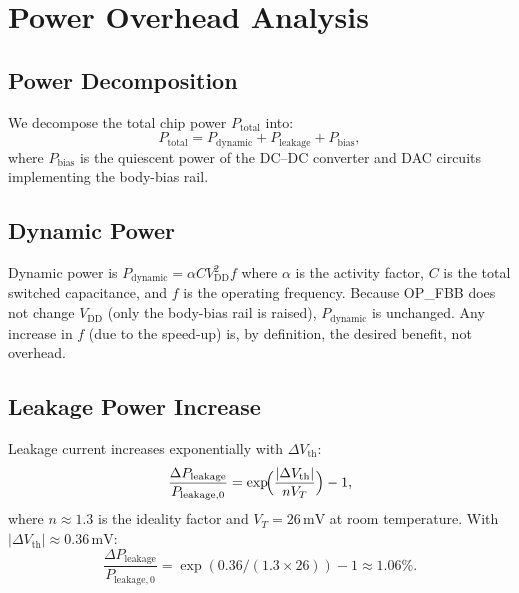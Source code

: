 \medskip
\noindent\anchorline{}

\section{Power Overhead Analysis}
\label{sec:power-overhead}

\subsection{Power Decomposition}
\label{subsec:power-decomp}

We decompose the total chip power $P_{\mathrm{total}}$ into:
\begin{equation}
  P_{\mathrm{total}} = P_{\mathrm{dynamic}} + P_{\mathrm{leakage}}
                     + P_{\mathrm{bias}},
  \label{eq:power-decomp}
\end{equation}
where $P_{\mathrm{bias}}$ is the quiescent power of the DC--DC converter
and DAC circuits implementing the body-bias rail.

\subsection{Dynamic Power}
\label{subsec:dynamic-power}

Dynamic power is $P_{\mathrm{dynamic}} = \alpha C V_{\mathrm{DD}}^{2} f$
where $\alpha$ is the activity factor, $C$ is the total switched
capacitance, and $f$ is the operating frequency.  Because OP\_FBB does
not change $V_{\mathrm{DD}}$ (only the body-bias rail is raised),
$P_{\mathrm{dynamic}}$ is unchanged.  Any increase in $f$ (due to the
speed-up) is, by definition, the desired benefit, not overhead.

\subsection{Leakage Power Increase}
\label{subsec:leakage-increase}

Leakage current increases exponentially with $\Delta V_{\mathrm{th}}$:
\begin{equation}
  \frac{\Delta P_{\mathrm{leakage}}}{P_{\mathrm{leakage,0}}}
    = \exp\!\Bigl(\frac{|\Delta V_{\mathrm{th}}|}{nV_{T}}\Bigr) - 1,
  \label{eq:leakage-ratio}
\end{equation}
where $n \approx 1.3$ is the ideality factor and $V_{T} = 26\,\mathrm{mV}$
at room temperature.  With $|\Delta V_{\mathrm{th}}| \approx 0.36\,\mathrm{mV}$:
\begin{equation}
  \frac{\Delta P_{\mathrm{leakage}}}{P_{\mathrm{leakage,0}}}
    = \exp(0.36 / (1.3 \times 26)) - 1
    \approx 1.06\%.
  \label{eq:leakage-num}
\end{equation}

